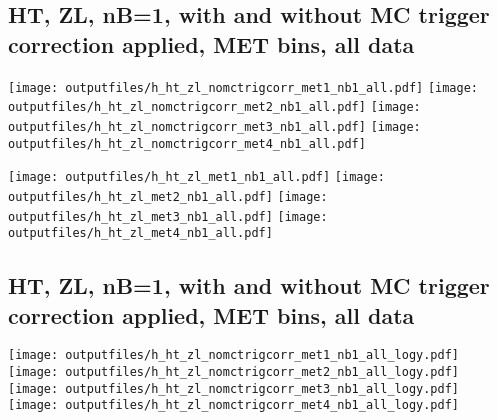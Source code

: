 \documentclass[11pt]{article}
\begin{document}







     \subsection{ HT, ZL, nB=1, with and without MC trigger correction applied, MET bins, all data}

    \noindent
     \texttt{[image: outputfiles/h\_ht\_zl\_nomctrigcorr\_met1\_nb1\_all.pdf]}
     \texttt{[image: outputfiles/h\_ht\_zl\_nomctrigcorr\_met2\_nb1\_all.pdf]}
     \texttt{[image: outputfiles/h\_ht\_zl\_nomctrigcorr\_met3\_nb1\_all.pdf]}
     \texttt{[image: outputfiles/h\_ht\_zl\_nomctrigcorr\_met4\_nb1\_all.pdf]}

    \noindent
     \texttt{[image: outputfiles/h\_ht\_zl\_met1\_nb1\_all.pdf]}
     \texttt{[image: outputfiles/h\_ht\_zl\_met2\_nb1\_all.pdf]}
     \texttt{[image: outputfiles/h\_ht\_zl\_met3\_nb1\_all.pdf]}
     \texttt{[image: outputfiles/h\_ht\_zl\_met4\_nb1\_all.pdf]}

   \clearpage
     \subsection{ HT, ZL, nB=1, with and without MC trigger correction applied, MET bins, all data}

    \noindent
     \texttt{[image: outputfiles/h\_ht\_zl\_nomctrigcorr\_met1\_nb1\_all\_logy.pdf]}
     \texttt{[image: outputfiles/h\_ht\_zl\_nomctrigcorr\_met2\_nb1\_all\_logy.pdf]}
     \texttt{[image: outputfiles/h\_ht\_zl\_nomctrigcorr\_met3\_nb1\_all\_logy.pdf]}
     \texttt{[image: outputfiles/h\_ht\_zl\_nomctrigcorr\_met4\_nb1\_all\_logy.pdf]}
\end{document}
